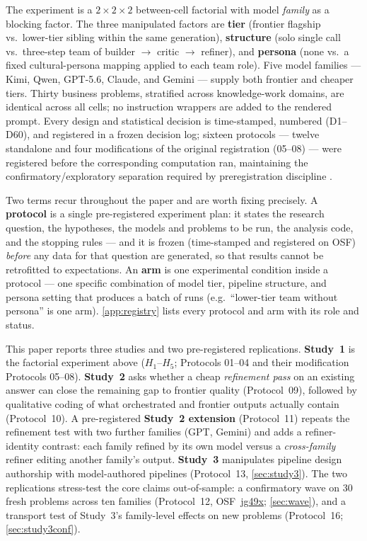 \documentclass[12pt,a4paper]{article}
\begin{document}
The experiment is a $2 \times 2 \times 2$ between-cell factorial with model
\emph{family} as a blocking factor. The three manipulated factors are
\textbf{tier} (frontier flagship vs.\ lower-tier sibling within the same
generation), \textbf{structure} (solo single call vs.\ three-step team of
builder $\to$ critic $\to$ refiner), and \textbf{persona} (none vs.\ a fixed
cultural-persona mapping applied to each team role). Five model families ---
Kimi, Qwen, GPT-5.6, Claude, and Gemini --- supply both frontier and cheaper
tiers. Thirty business problems, stratified across knowledge-work domains,
are identical across all cells; no instruction wrappers are added to the
rendered prompt. Every design and statistical decision is time-stamped, numbered
(D1--D60), and registered in a frozen decision log; sixteen protocols ---
twelve standalone and four modifications of the original registration (05--08)
--- were registered before the corresponding computation ran, maintaining
the confirmatory/exploratory separation required by preregistration discipline
\citep{NosekEtAl2018}.

Two terms recur throughout the paper and are worth fixing precisely. A
\textbf{protocol} is a single pre-registered experiment plan: it states the
research question, the hypotheses, the models and problems to be run, the
analysis code, and the stopping rules --- and it is frozen (time-stamped and
registered on OSF) \emph{before} any data for that question are generated, so
that results cannot be retrofitted to expectations. An \textbf{arm} is one
experimental condition inside a protocol --- one specific combination of model
tier, pipeline structure, and persona setting that produces a batch of runs
(e.g.\ ``lower-tier team without persona'' is one arm). \cref{app:registry}
lists every protocol and arm with its role and status.

This paper reports three studies and two pre-registered replications.
\textbf{Study~1} is the factorial experiment above ($H_1$--$H_5$; Protocols
01--04 and their modification Protocols 05--08). \textbf{Study~2} asks whether a cheap
\emph{refinement pass} on an existing answer can close the remaining gap to
frontier quality (Protocol~09), followed by qualitative coding of what
orchestrated and frontier outputs actually contain (Protocol~10). A
pre-registered \textbf{Study~2 extension} (Protocol~11) repeats the refinement
test with two further families (GPT, Gemini) and adds a refiner-identity
contrast: each family refined by its own model versus a \emph{cross-family}
refiner editing another family's output. \textbf{Study~3}
manipulates pipeline design authorship with model-authored pipelines
(Protocol~13, \cref{sec:study3}). The two replications stress-test the core
claims out-of-sample: a confirmatory wave on 30 fresh problems across ten
families (Protocol~12, OSF~\href{https://osf.io/jg49x}{jg49x};
\cref{sec:wave}), and a transport test of Study~3's family-level effects on
new problems (Protocol~16; \cref{sec:study3conf}).
\end{document}
